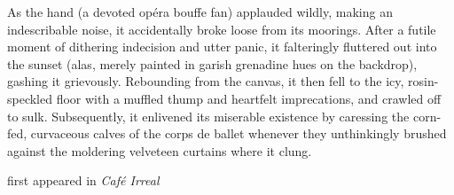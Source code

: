 As the hand (a devoted opéra bouffe fan) applauded wildly, making an
indescribable noise, it accidentally broke loose from its moorings.
After a futile moment of dithering indecision and utter panic, it
falteringly fluttered out into the sunset (alas, merely painted in
garish grenadine hues on the backdrop), gashing it grievously.
Rebounding from the canvas, it then fell to the icy, rosin-speckled
floor with a muffled thump and heartfelt imprecations, and crawled off
to sulk. Subsequently, it enlivened its miserable existence by caressing
the corn-fed, curvaceous calves of the corps de ballet whenever they
unthinkingly brushed against the moldering velveteen curtains where it
clung.

first appeared in \emph{Café Irreal}
